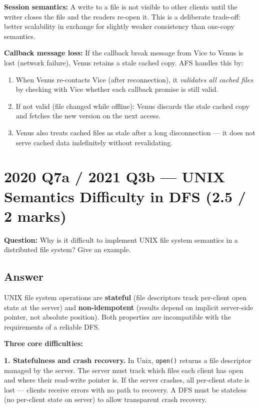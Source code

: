 \documentclass[12pt,a4paper]{article}
\begin{document}
\textbf{Session semantics:} A write to a file is not visible to other clients until the writer closes the file and the readers re-open it. This is a deliberate trade-off: better scalability in exchange for slightly weaker consistency than one-copy semantics.

\textbf{Callback message loss:} If the callback break message from Vice to Venus is lost (network failure), Venus retains a stale cached copy. AFS handles this by:
\begin{enumerate}[noitemsep]
  \item When Venus re-contacts Vice (after reconnection), it \emph{validates all cached files} by checking with Vice whether each callback promise is still valid.
  \item If not valid (file changed while offline): Venus discards the stale cached copy and fetches the new version on the next access.
  \item Venus also treats cached files as stale after a long disconnection --- it does not serve cached data indefinitely without revalidating.
\end{enumerate}

\section{2020 Q7a / 2021 Q3b --- UNIX Semantics Difficulty in DFS (2.5 / 2 marks)}

\textbf{Question:} Why is it difficult to implement UNIX file system semantics in a distributed file system? Give an example.

\subsection*{Answer}

UNIX file system operations are \textbf{stateful} (file descriptors track per-client open state at the server) and \textbf{non-idempotent} (results depend on implicit server-side pointer, not absolute position). Both properties are incompatible with the requirements of a reliable DFS.

\textbf{Three core difficulties:}

\textbf{1. Statefulness and crash recovery.}
In Unix, \texttt{open()} returns a file descriptor managed by the server. The server must track which files each client has open and where their read-write pointer is. If the server crashes, all per-client state is lost --- clients receive errors with no path to recovery. A DFS must be stateless (no per-client state on server) to allow transparent crash recovery.
\end{document}
